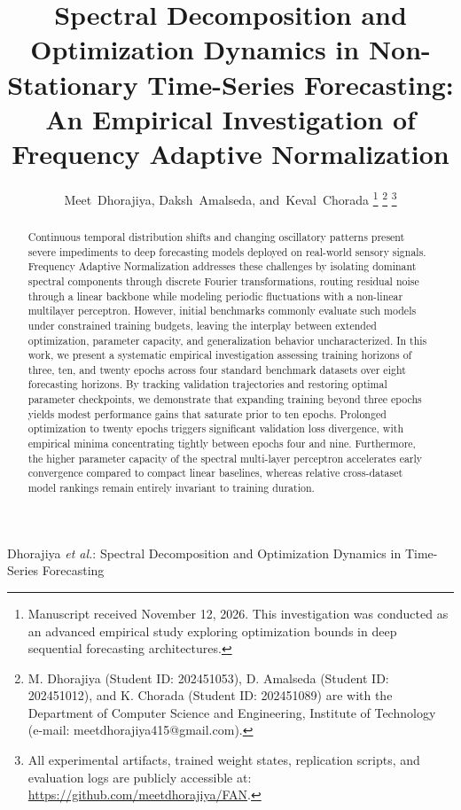 \documentclass[journal]{IEEEtran}
\begin{document}
\title{Spectral Decomposition and Optimization Dynamics in Non-Stationary Time-Series Forecasting: An Empirical Investigation of Frequency Adaptive Normalization}

\author{Meet~Dhorajiya, Daksh~Amalseda, and~Keval~Chorada%
\thanks{Manuscript received November 12, 2026. This investigation was conducted as an advanced empirical study exploring optimization bounds in deep sequential forecasting architectures.}%
\thanks{M. Dhorajiya (Student ID: 202451053), D. Amalseda (Student ID: 202451012), and K. Chorada (Student ID: 202451089) are with the Department of Computer Science and Engineering, Institute of Technology (e-mail: meetdhorajiya415@gmail.com).}%
\thanks{All experimental artifacts, trained weight states, replication scripts, and evaluation logs are publicly accessible at: \url{https://github.com/meetdhorajiya/FAN}.}}

%
{Dhorajiya \MakeLowercase{\textit{et al.}}: Spectral Decomposition and Optimization Dynamics in Time-Series Forecasting}

\maketitle

\begin{abstract}
Continuous temporal distribution shifts and changing oscillatory patterns present severe impediments to deep forecasting models deployed on real-world sensory signals. Frequency Adaptive Normalization addresses these challenges by isolating dominant spectral components through discrete Fourier transformations, routing residual noise through a linear backbone while modeling periodic fluctuations with a non-linear multilayer perceptron. However, initial benchmarks commonly evaluate such models under constrained training budgets, leaving the interplay between extended optimization, parameter capacity, and generalization behavior uncharacterized. In this work, we present a systematic empirical investigation assessing training horizons of three, ten, and twenty epochs across four standard benchmark datasets over eight forecasting horizons. By tracking validation trajectories and restoring optimal parameter checkpoints, we demonstrate that expanding training beyond three epochs yields modest performance gains that saturate prior to ten epochs. Prolonged optimization to twenty epochs triggers significant validation loss divergence, with empirical minima concentrating tightly between epochs four and nine. Furthermore, the higher parameter capacity of the spectral multi-layer perceptron accelerates early convergence compared to compact linear baselines, whereas relative cross-dataset model rankings remain entirely invariant to training duration.
\end{abstract}
\end{document}

